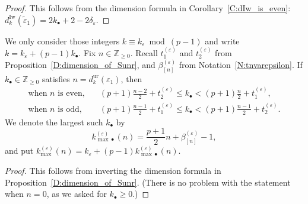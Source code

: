 \begin{proof}
    This follows from the dimension formula in Corollary~\ref{C:dIw_is_even}: $d_{k}^{{\mathrm{Iw}}}(\tilde \varepsilon_1) = 2k_\bullet + 2-2\delta_\varepsilon$.
\end{proof}

\begin{lemmanotation}
    \label{L:extremal_ks_part2}
    We only consider those integers $k \equiv k_\varepsilon \bmod{(p-1)}$ and write $k=k_\varepsilon+(p-1)k_{\bullet}$. Fix $n\in {\mathbb{Z}}_{ \geq 0}$.
    Recall $t_1^{(\varepsilon)}$ and $t_2^{(\varepsilon)}$ from Proposition~\ref{D:dimension_of_Sunr}, and $\beta_{[n]}^{(\varepsilon)}$ from Notation~\ref{N:tnvarepsilon}.
    If $k_\bullet \in {\mathbb{Z}}_{\geq 0}$ satisfies $n = d_{k}^{\mathrm{ur}}(\varepsilon_1)$, then
    \begin{align*}
    \textrm{when } n \textrm{ is even,}&\quad (p+1)\tfrac {n-2}2 + t_2^{(\varepsilon)} \leq  k_\bullet  < (p+1)\tfrac {n}2 + t_1^{(\varepsilon)},
    \\
    \textrm{when } n \textrm{ is odd,}&\quad (p+1)\tfrac {n-1}2 + t_1^{(\varepsilon)} \leq k_\bullet < (p+1)\tfrac {n-1}2 + t_2^{(\varepsilon)}.
    \end{align*}
    We denote the largest such $k_\bullet$ by  $$k_{{\max}\bullet}^{(\varepsilon)}(n)=\frac{p+1}2 n + \beta_{[n]}^{(\varepsilon)}-1,$$
    and put $k_{\max}^{(\varepsilon)}(n) = k_\varepsilon + (p-1)k_{{\max}\bullet}^{(\varepsilon)}(n)$.
\end{lemmanotation}

\begin{proof}
    This follows from inverting the dimension formula in Proposition~\ref{D:dimension_of_Sunr}. (There is no problem with the statement when $n=0$, as we asked for $k_\bullet \geq 0$.)
\end{proof}

